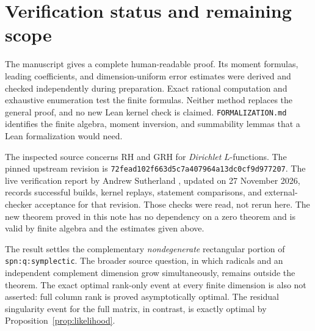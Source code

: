\documentclass[11pt,letterpaper]{article}
\theoremstyle{remark}
\begin{document}
\section{Verification status and remaining scope}

The manuscript gives a complete human-readable proof. Its moment formulas,
leading coefficients, and dimension-uniform error estimates were derived
and checked independently during preparation. Exact rational computation
and exhaustive enumeration test the finite formulas. Neither method
replaces the general proof, and no new Lean kernel check is claimed.
\texttt{FORMALIZATION.md} identifies the finite algebra, moment inversion,
and summability lemmas that a Lean formalization would need.

The inspected source concerns RH and GRH for \emph{Dirichlet} $L$-functions.
The pinned upstream revision is
\texttt{72fead102f663d5c7a407964a13dc0cf9d977207}.
The live verification report by Andrew Sutherland \cite{Sutherland},
updated on 27 November 2026, records successful builds, kernel replays,
statement comparisons, and external-checker acceptance for that revision.
Those checks were read, not rerun here. The new theorem proved in this note
has no dependency on a zero theorem and is valid by finite algebra and
the estimates given above.

The result settles the complementary \emph{nondegenerate} rectangular
portion of \texttt{spn:q:symplectic}. The broader source question, in which
radicals and an independent complement dimension grow simultaneously,
remains outside the theorem. The exact optimal rank-only event at every
finite dimension is also not asserted: full column rank is proved
asymptotically optimal. The residual singularity event for the full matrix,
in contrast, is exactly optimal by Proposition~\ref{prop:likelihood}.
\end{document}
